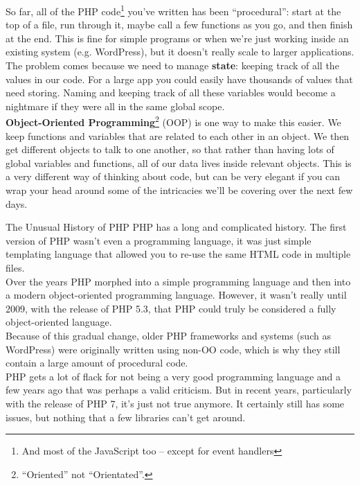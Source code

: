 So far, all of the PHP code\footnote{And most of the JavaScript too – except for event handlers} you've written has been ``procedural'': start at the top of a file, run through it, maybe call a few functions as you go, and then finish at the end. This is fine for simple programs or when we're just working inside an existing system (e.g. WordPress), but it doesn't really scale to larger applications.
\\

The problem comes because we need to manage \textbf{state}: keeping track of all the values in our code. For a large app you could easily have thousands of values that need storing. Naming and keeping track of all these variables would become a nightmare if they were all in the same global scope.
\\

\textbf{Object-Oriented Programming}\footnote{``Oriented'' not ``Orientated''.} (OOP) is one way to make this easier. We keep functions and variables that are related to each other in an object. We then get different objects to talk to one another, so that rather than having lots of global variables and functions, all of our data lives inside relevant objects. This is a very different way of thinking about code, but can be very elegant if you can wrap your head around some of the intricacies we'll be covering over the next few days.

\pagebreak

\begin{infobox}{The Unusual History of PHP}
    PHP has a long and complicated history. The first version of PHP wasn't even a programming language, it was just simple templating language that allowed you to re-use the same HTML code in multiple files.
    \\

    Over the years PHP morphed into a simple programming language and then into a modern object-oriented programming language. However, it wasn't really until 2009, with the release of PHP 5.3, that PHP could truly be considered a fully object-oriented language.
    \\

    Because of this gradual change, older PHP frameworks and systems (such as WordPress) were originally written using non-OO code, which is why they still contain a large amount of procedural code.
    \\

    PHP gets a lot of flack for not being a very good programming language and a few years ago that was perhaps a valid criticism. But in recent years, particularly with the release of PHP 7, it's just not true anymore. It certainly still has some issues, but nothing that a few libraries can't get around.

\end{infobox}


